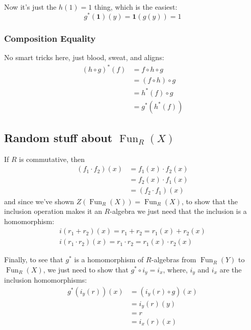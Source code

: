 \documentclass[12pt]{article}
\DeclareMathOperator{\Fun}{Fun}
\begin{document}
Now it's just the $h(1)=1$ thing, which is the easiest:
\[g^*(\mathbf{1})(y)=\mathbf{1}(g(y))=1\]

\subsubsection{Composition Equality}

No smart tricks here, just blood, sweat, and aligns:
\begin{align*}
  (h \circ g)^*(f)
   & = f \circ h \circ g   \\
   & = (f \circ h) \circ g \\
   & = h^*(f) \circ g      \\
   & = g^*(h^*(f))
\end{align*}

\subsection{Random stuff about \texorpdfstring{$\Fun_R(X)$}{Fun\_R(X)}}

If $R$ is commutative, then
\begin{align*}
  (f_1 \cdot f_2)(x)
   & = f_1(x) \cdot f_2(x) \\
   & = f_2(x) \cdot f_1(x) \\
   & = (f_2 \cdot f_1)(x)
\end{align*}
and since we've shown $Z(\Fun_R(X))=\Fun_R(X)$, to show that the inclusion
operation makes it an $R$-algebra we just need that the inclusion is a homomorphism:
\begin{gather*}
  i(r_1+r_2)(x) = r_1 + r_2 = r_1(x) + r_2(x) \\
  i(r_1 \cdot r_2)(x) = r_1 \cdot r_2 = r_1(x) \cdot r_2(x)
\end{gather*}

Finally, to see that $g^*$ is a homomorphism of $R$-algebras
from $\Fun_R(Y)$ to $\Fun_R(X)$, we just need to show that $g^* \circ i_y = i_x$,
where, $i_y$ and $i_x$ are the inclusion homomorphisms:
\begin{align*}
  g^*(i_y(r))(x)
   & = (i_y(r) \circ g)(x) \\
   & = i_y(r)(y)           \\
   & = r                   \\
   & = i_x(r)(x)
\end{align*}
\end{document}
